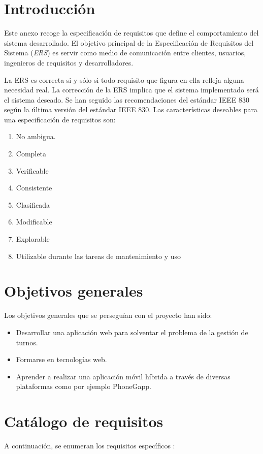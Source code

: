 
\section{Introducción}\label{introduccion-requisitos}

Este anexo recoge la especificación de requisitos que define el comportamiento del sistema desarrollado. El objetivo principal de la Especificación de Requisitos del Sistema (\emph{ERS}) es servir como medio de comunicación entre clientes, usuarios, ingenieros de requisitos y desarrolladores.

La ERS es correcta si y sólo si todo requisito que figura en ella refleja alguna necesidad
real. La corrección de la ERS implica que el sistema implementado será el sistema
deseado. Se han seguido las recomendaciones del estándar IEEE 830 según la última versión del estándar IEEE 830. Las características deseables para una especificación de requisitos son:


\begin{enumerate}
	\item No ambigua.
	\item Completa
	\item  Verificable
	\item  Consistente
	\item  Clasificada
	\item  Modificable
	\item  Explorable
	\item  Utilizable durante las tareas de mantenimiento y uso
\end{enumerate}


\section{Objetivos generales}\label{objetivos-generales}
Los objetivos generales que se perseguían con el proyecto han sido:
\begin{itemize}
	\item Desarrollar una aplicación web para solventar el problema de la gestión de turnos.
	\item Formarse en tecnologías web.
	\item Aprender a realizar una aplicación móvil híbrida a través de diversas plataformas como por ejemplo PhoneGapp.
\end{itemize}


\section{Catálogo de requisitos}\label{catalogo-requisitos}
A continuación, se enumeran los requisitos específicos :

